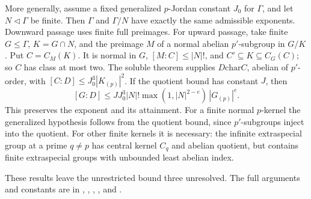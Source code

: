 More generally, assume a fixed generalized \(p\)-Jordan constant
\(J_0\) for \(\Gamma\), and let \(N\lhd\Gamma\) be finite.
Then \(\Gamma\) and \(\Gamma/N\) have exactly the same admissible
exponents. Downward passage uses finite full preimages.
For upward passage, take finite \(G\le\Gamma\), \(K=G\cap N\),
and the preimage \(M\) of a normal abelian \(p'\)-subgroup
in \(G/K\). Put \(C=C_M(K)\). It is normal in \(G\),
\([M:C]\le|N|!\), and \(C'\subseteq K\subseteq C_G(C)\);
so \(C\) has class at most two.
The soluble theorem supplies \(D\mathrel{\mathrm{char}} C\), abelian of \(p'\)-order,
with \([C:D]\le J_0^3|K_{(p)}|^2\).
If the quotient bound has constant \(J\), then
\[
 [G:D]\le
 JJ_0^3|N|!\max(1,|N|^{2-e})\,|G_{(p)}|^e.
\]
This preserves the exponent and its attainment.
For a finite normal \(p\)-kernel the generalized hypothesis
follows from the quotient bound, since \(p'\)-subgroups inject
into the quotient. For other finite kernels it is necessary:
the infinite extraspecial group at a prime \(q\ne p\) has
central kernel \(C_q\) and abelian quotient, but contains finite
extraspecial groups with unbounded least abelian index.

These results leave the unrestricted bound three unresolved.
The full arguments and constants are in
,
,
,
, and
.
